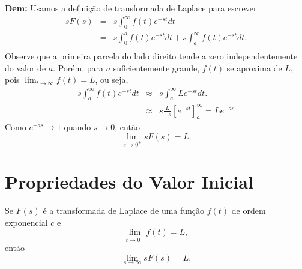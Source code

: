 \documentclass[a4paper,10pt]{book}
\begin{document}
 {\bf Dem:}
Usamos a definição de transformada de Laplace para escrever
\begin{eqnarray*}
sF(s)&=&s\int_0^\infty f(t)e^{-st}dt\\
&=&s\int_0^a f(t)e^{-st}dt+s\int_a^\infty f(t)e^{-st}dt.\\
\end{eqnarray*}
Observe que a primeira parcela do lado direito tende a zero independentemente do valor de $a$. Porém, para $a$ suficientemente grande, $f(t)$ se aproxima de $L$, pois $\displaystyle \lim_{t\to\infty}f(t)=L$, ou seja,
\begin{eqnarray*}
s\int_a^\infty f(t)e^{-st}dt &\approx &s\int_a^\infty L e^{-st}dt.\\
&\approx &s\frac{L}{-s}\left[ e^{-st}\right]_a^\infty=Le^{-as}
\end{eqnarray*}
Como $e^{-as}\to 1$ quando $s\to 0$, então
\begin{equation}
\lim_{s\to 0^+} sF(s)=L.
\end{equation} 

\section{Propriedades do Valor Inicial}

Se $F(s)$ é a transformada de Laplace de uma função $f(t)$ de ordem exponencial $c$ e 
 \begin{equation}
 \lim_{t\to 0^+}f(t)=L,
 \end{equation}
 então
 \begin{equation}
 \lim_{s\to \infty} sF(s)=L.
 \end{equation}
\end{document}
